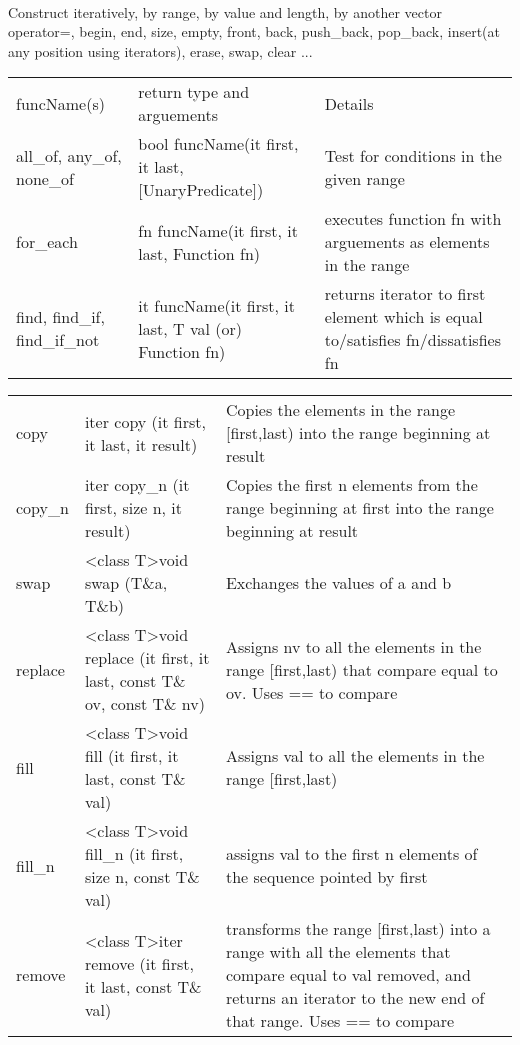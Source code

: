  \\
Construct iteratively, by range, by value and length, by another vector \\
operator=, begin, end, size, empty, front, back, push\_back, pop\_back, insert(at any position using iterators), erase, swap, clear ...



\begin{tabular}{p{2cm}|p{5cm}|p{5.5cm}}
	funcName(s)	&	return type and arguements	&	Details	\\
	all\_of, any\_of, none\_of	& bool funcName(it first, it last, [UnaryPredicate])	&	Test for conditions in the given range	\\
	for\_each 	&	fn funcName(it first, it last, Function fn) &	executes function fn with arguements as elements in the range \\
	find, find\_if, find\_if\_not	&	it funcName(it first, it last, T val (or) Function fn)	&	returns iterator to first element which is equal to/satisfies fn/dissatisfies fn \\

\end{tabular}


\begin{tabular}{p{2cm}|p{5cm}|p{5.5cm}}
	copy   &   iter copy (it first, it last, it result)   &   Copies the elements in the range [first,last) into the range beginning at result \\
	copy\_n   &   iter copy\_n (it first, size n, it result)   &   Copies the first n elements from the range beginning at first into the range beginning at result \\
	swap   &   \textless class T\textgreater void swap (T\&a, T\&b)   &   Exchanges the values of a and b \\
	replace   &   \textless class T\textgreater void replace (it first, it last, const T\& ov, const T\& nv)   &   Assigns nv to all the elements in the range [first,last) that compare equal to ov. Uses == to compare \\
	fill   &   \textless class T\textgreater void fill (it first, it last, const T\& val)   &   Assigns val to all the elements in the range [first,last) \\
	fill\_n   &   \textless class T\textgreater void fill\_n (it first, size n, const T\& val)   &    assigns val to the first n elements of the sequence pointed by first \\
	remove   &   \textless class T\textgreater iter remove (it first, it last, const T\& val)   &   transforms the range [first,last) into a range with all the elements that compare equal to val removed, and returns an iterator to the new end of that range. Uses == to compare \\
\end{tabular}


